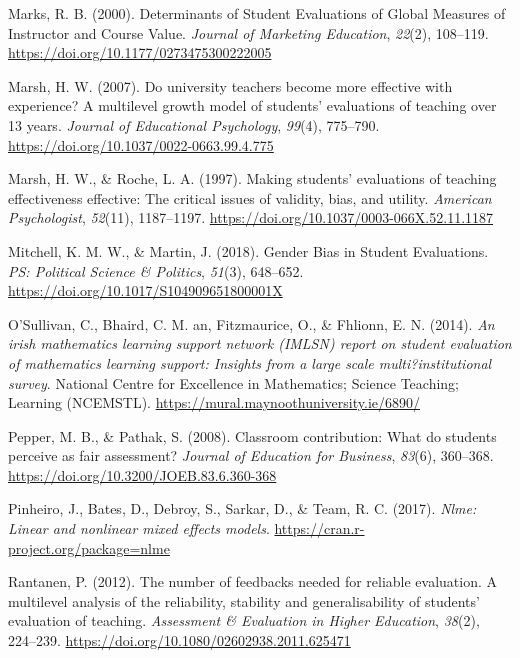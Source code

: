 \documentclass[
  man]{apa7}
\newlength{\cslhangindent}
\newenvironment{CSLReferences}[2] %
 {\begin{list}{}{%
  \setlength{\itemindent}{0pt}
  \setlength{\leftmargin}{0pt}
  \setlength{\parsep}{0pt}
  \ifodd #1
   \setlength{\leftmargin}{\cslhangindent}
   \setlength{\itemindent}{-1\cslhangindent}
  \fi
  \setlength{\itemsep}{#2\baselineskip}}}
 {\end{list}}
\begin{document}
\begin{CSLReferences}{1}{0}
Marks, R. B. (2000). Determinants of Student Evaluations of Global Measures of Instructor and Course Value. \emph{Journal of Marketing Education}, \emph{22}(2), 108--119. \url{https://doi.org/10.1177/0273475300222005}

Marsh, H. W. (2007). Do university teachers become more effective with experience? A multilevel growth model of students' evaluations of teaching over 13 years. \emph{Journal of Educational Psychology}, \emph{99}(4), 775--790. \url{https://doi.org/10.1037/0022-0663.99.4.775}

Marsh, H. W., \& Roche, L. A. (1997). Making students' evaluations of teaching effectiveness effective: The critical issues of validity, bias, and utility. \emph{American Psychologist}, \emph{52}(11), 1187--1197. \url{https://doi.org/10.1037/0003-066X.52.11.1187}

Mitchell, K. M. W., \& Martin, J. (2018). Gender Bias in Student Evaluations. \emph{PS: Political Science \& Politics}, \emph{51}(3), 648--652. \url{https://doi.org/10.1017/S104909651800001X}

O'Sullivan, C., Bhaird, C. M. an, Fitzmaurice, O., \& Fhlionn, E. N. (2014). \emph{An irish mathematics learning support network (IMLSN) report on student evaluation of mathematics learning support: Insights from a large scale multi?institutional survey}. National Centre for Excellence in Mathematics; Science Teaching; Learning (NCEMSTL). \url{https://mural.maynoothuniversity.ie/6890/}

Pepper, M. B., \& Pathak, S. (2008). Classroom contribution: What do students perceive as fair assessment? \emph{Journal of Education for Business}, \emph{83}(6), 360--368. \url{https://doi.org/10.3200/JOEB.83.6.360-368}

Pinheiro, J., Bates, D., Debroy, S., Sarkar, D., \& Team, R. C. (2017). \emph{Nlme: Linear and nonlinear mixed effects models}. \url{https://cran.r-project.org/package=nlme}

Rantanen, P. (2012). The number of feedbacks needed for reliable evaluation. A multilevel analysis of the reliability, stability and generalisability of students{'} evaluation of teaching. \emph{Assessment \& Evaluation in Higher Education}, \emph{38}(2), 224--239. \url{https://doi.org/10.1080/02602938.2011.625471}


\end{CSLReferences}
\end{document}

